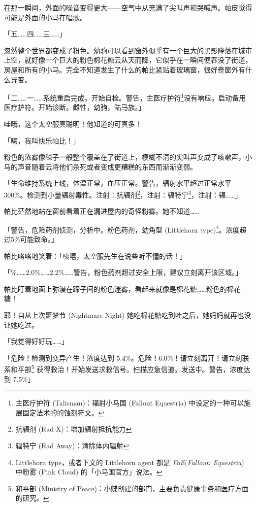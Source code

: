 在那一瞬间，外面的噪音变得更大——空气中从充满了尖叫声和哭喊声。帕皮觉得可能是外面的小马在唱歌。

「{\mt 五……四……三……}」

忽然整个世界都变成了粉色。幼驹可以看到窗外似乎有一个巨大的黑影降落在城市上空，就好像一个巨大的粉色棉花糖云从天而降，它似乎在一瞬间便吞没了街道，房屋和所有的小马。完全不知道发生了什么的帕比紧贴着玻璃窗，很好奇窗外有什么异变。

「{\mt 二……一……系统重启完成。开始自检。警告，主医疗护符\footnote{主医疗护符 (Talisman)：辐射小马国 (Fallout Equestria) 中设定的一种可以施展固定法术的的蚀刻符文。}没有响应。启动备用医疗护符。开始诊断。雌性，幼驹，陆马族。}」

哇哦，这个太空服真聪明！他知道的可真多！

「嗨，我叫快乐帕比！」

粉色的浓雾像毯子一般整个覆盖在了街道上，模糊不清的尖叫声变成了咳嗽声，小马的声音随着云将他们杀死或者变成更糟糕的东西而渐渐变弱。

「{\mt 生命维持系统上线，体温正常，血压正常。警告，辐射水平超过正常水平300\%。检测到小量辐射毒性。注射：抗辐剂\footnote{抗辐剂 (Rad-X)：增加辐射抵抗能力}，注射：辐特宁\footnote{辐特宁 (Rad Away)：清除体内辐射}，注射：辐……}」


帕比茫然地站在窗前看着正在漏进屋内的奇怪粉雾。她不知道……


「{\mt 警告，危险药剂侦测，分析中。粉色药剂，幼角型 (Littlehorn type)\footnote{Littlehorn type，或者下文的 Littlehorn agent 都是 \emph{FoE}(\emph{Fallout: Equestria}) 中粉雾 (Pink Cloud) 的「小马国官方」说法。}。浓度超过5\%可能致命。}」

帕比咯咯地笑着：「咦嘻，太空服先生在说些听不懂的话！」

「{\%……2.0\%……2.2\%……警告，粉色药剂超过安全上限，建议立刻离开该区域。}」

帕比盯着地面上弥漫在蹄子间的粉色迷雾，看起来就像是棉花糖……粉色的棉花糖！

耶！自从上次噩梦节 (Nightmare Night) 她吃棉花糖吃到吐之后，她妈妈就再也没让她吃过。

「我觉得好好玩……」

「{\mt 危险！检测到变异产生！浓度达到 5.4\%。危险！6.0\%！请立刻离开！请立刻联系和平部\footnote{和平部 (Ministry of Peace)：小蝶创建的部门，主要负责健康事务和医疗方面的研究。} 获得救治！开始发送求救信号。扫描应急信道。发送中。警告，浓度达到 7.5\%}」


